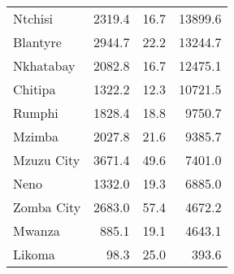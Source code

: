 \begin{tabular}{lrrr}
Ntchisi        &      2319.4 &         16.7 &          13899.6 \\
Blantyre       &      2944.7 &         22.2 &          13244.7 \\
Nkhatabay      &      2082.8 &         16.7 &          12475.1 \\
Chitipa        &      1322.2 &         12.3 &          10721.5 \\
Rumphi         &      1828.4 &         18.8 &           9750.7 \\
Mzimba         &      2027.8 &         21.6 &           9385.7 \\
Mzuzu City     &      3671.4 &         49.6 &           7401.0 \\
Neno           &      1332.0 &         19.3 &           6885.0 \\
Zomba City     &      2683.0 &         57.4 &           4672.2 \\
Mwanza         &       885.1 &         19.1 &           4643.1 \\
Likoma         &        98.3 &         25.0 &            393.6 \\
\bottomrule
\end{tabular}
